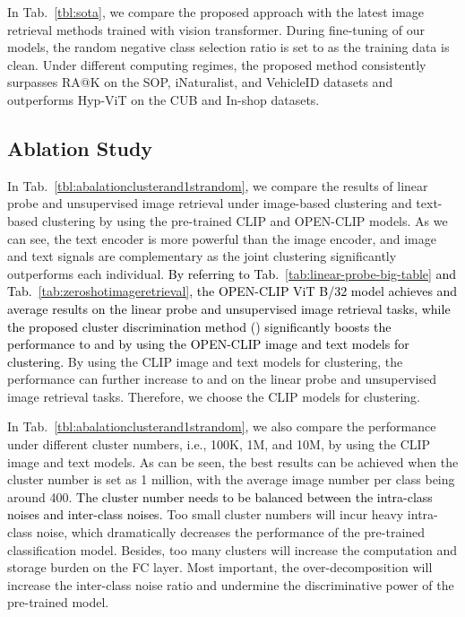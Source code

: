 \documentclass{article} \usepackage{iclr2023_conference,times}
\begin{document}
In Tab.~\ref{tbl:sota}, we compare the proposed approach with the latest image retrieval methods \citep{Patel2022CVPR,Ermolov_2022_CVPR} trained with vision transformer. During fine-tuning of our models, the random negative class selection ratio  is set to  as the training data is clean.
Under different computing regimes, the proposed method consistently surpasses RA@K \citep{Patel2022CVPR} on the SOP, iNaturalist, and VehicleID datasets and outperforms Hyp-ViT \citep{Ermolov_2022_CVPR}  on the CUB and In-shop datasets.

\subsection{Ablation Study}

 In Tab.~\ref{tbl:abalationclusterand1strandom}, we compare the results of linear probe and unsupervised image retrieval under image-based clustering and text-based clustering by using the pre-trained CLIP and OPEN-CLIP models. As we can see, the text encoder is more powerful than the image encoder, and image and text signals are complementary as the joint clustering significantly outperforms each individual. \textcolor{black}{By referring to Tab.~\ref{tab:linear-probe-big-table} and Tab.~\ref{tab:zeroshotimageretrieval}, the OPEN-CLIP ViT B/32 model achieves  and  average results on the linear probe and unsupervised image retrieval tasks, while the proposed cluster discrimination method () significantly boosts the performance to  and  by using the OPEN-CLIP image and text models for clustering.} By using the CLIP image and text models for clustering, the performance can further increase to  and  on the linear probe and unsupervised image retrieval tasks. Therefore, we choose the CLIP models for clustering.

In Tab.~\ref{tbl:abalationclusterand1strandom}, we also compare the performance under different cluster numbers, i.e., 100K, 1M, and 10M, by using the CLIP image and text models. As can be seen, the best results can be achieved when the cluster number is set as 1 million, with the average image number per class being around 400. \textcolor{black}{The cluster number needs to be balanced between the intra-class noises and inter-class noises.} Too small cluster numbers will incur heavy intra-class noise, which dramatically decreases the performance of the pre-trained classification model. Besides, too many clusters will increase the computation and storage burden on the FC layer. Most important, the over-decomposition will increase the inter-class noise ratio and undermine the discriminative power of the pre-trained model. 
\end{document}
